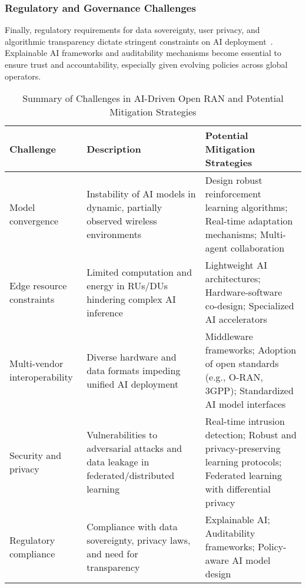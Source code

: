 \documentclass[sigconf]{acmart}
\begin{document}
\subsubsection{Regulatory and Governance Challenges}
Finally, regulatory requirements for data sovereignty, user privacy, and algorithmic transparency dictate stringent constraints on AI deployment~\cite{ref48,ref54}. Explainable AI frameworks and auditability mechanisms become essential to ensure trust and accountability, especially given evolving policies across global operators.

\begin{table*}[htbp]
\centering
\caption{Summary of Challenges in AI-Driven Open RAN and Potential Mitigation Strategies}
\label{tab:challenges}
\begin{adjustbox}{max width=\textwidth}
\begin{tabular}{@{}lll@{}}
\toprule
\textbf{Challenge} & \textbf{Description} & \textbf{Potential Mitigation Strategies} \\ \midrule
Model convergence & Instability of AI models in dynamic, partially observed wireless environments~\cite{ref54} & Design robust reinforcement learning algorithms; Real-time adaptation mechanisms; Multi-agent collaboration \\[6pt]
Edge resource constraints & Limited computation and energy in RUs/DUs hindering complex AI inference~\cite{ref48,ref54} & Lightweight AI architectures; Hardware-software co-design; Specialized AI accelerators \\[6pt]
Multi-vendor interoperability & Diverse hardware and data formats impeding unified AI deployment~\cite{ref49,ref54} & Middleware frameworks; Adoption of open standards (e.g., O-RAN, 3GPP); Standardized AI model interfaces \\[6pt]
Security and privacy & Vulnerabilities to adversarial attacks and data leakage in federated/distributed learning~\cite{ref50,ref54} & Real-time intrusion detection; Robust and privacy-preserving learning protocols; Federated learning with differential privacy \\[6pt]
Regulatory compliance & Compliance with data sovereignty, privacy laws, and need for transparency~\cite{ref48,ref54} & Explainable AI; Auditability frameworks; Policy-aware AI model design \\ \bottomrule
\end{tabular}
\end{adjustbox}
\end{table*}
\end{document}
